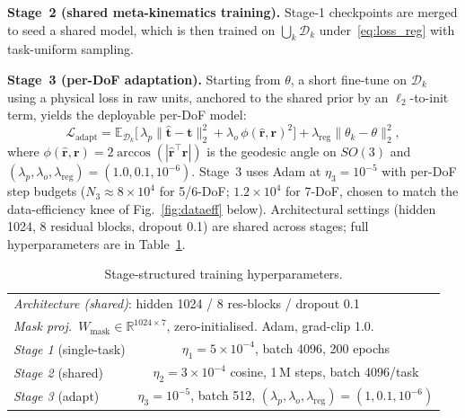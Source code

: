 \documentclass[conference]{IEEEtran}
\begin{document}
\textbf{Stage~2 (shared meta-kinematics training).} Stage-1 checkpoints are merged to seed a shared model, which is then trained on $\bigcup_k\mathcal{D}_k$ under~\eqref{eq:loss_reg} with task-uniform sampling.

\textbf{Stage~3 (per-DoF adaptation).} Starting from $\theta$, a short fine-tune on $\mathcal{D}_k$ using a physical loss in raw units, anchored to the shared prior by an $\ell_2$-to-init term, yields the deployable per-DoF model:
\begin{equation}
\!\!\mathcal{L}_{\mathrm{adapt}}\!=\!\mathbb{E}_{\mathcal{D}_k}\!\bigl[\,\lambda_p\lVert\hat{\mathbf{t}}-\mathbf{t}\rVert_2^2\!+\!\lambda_o\,\phi(\hat{\mathbf{r}},\mathbf{r})^2\bigr]\!+\!\lambda_{\mathrm{reg}}\lVert\theta_k\!-\!\theta\rVert_2^2,
\label{eq:loss_adapt}
\end{equation}
where $\phi(\hat{\mathbf{r}},\mathbf{r})\!=\!2\arccos(|\hat{\mathbf{r}}^\top\mathbf{r}|)$ is the geodesic angle on $SO(3)$ and $(\lambda_p,\lambda_o,\lambda_{\mathrm{reg}})\!=\!(1.0,0.1,10^{-6})$. Stage~3 uses Adam at $\eta_3\!=\!10^{-5}$ with per-DoF step budgets ($N_3\!\approx\!8\!\times\!10^4$ for 5/6-DoF; $1.2\!\times\!10^4$ for 7-DoF, chosen to match the data-efficiency knee of Fig.~\ref{fig:dataeff} below). Architectural settings (hidden 1024, 8 residual blocks, dropout 0.1) are shared across stages; full hyperparameters are in Table~\ref{tab:hparams}.

\begin{table}[!t]
\renewcommand{\arraystretch}{1.05}
\caption{Stage-structured training hyperparameters.}
\label{tab:hparams}
\centering
\footnotesize
\begin{tabular}{lc}
\toprule
\multicolumn{2}{l}{\textit{Architecture (shared)}: hidden 1024 / 8 res-blocks / dropout 0.1} \\
\multicolumn{2}{l}{\textit{Mask proj.\ }$W_{\mathrm{mask}}\!\in\!\mathbb{R}^{1024\times 7}$, zero-initialised. Adam, grad-clip 1.0.} \\
\midrule
\textit{Stage 1} (single-task) & $\eta_1\!=\!5\!\times\!10^{-4}$, batch 4096, 200 epochs \\
\textit{Stage 2} (shared) & $\eta_2\!=\!3\!\times\!10^{-4}$ cosine, 1\,M steps, batch 4096/task \\
\textit{Stage 3} (adapt) & $\eta_3\!=\!10^{-5}$, batch 512, $(\lambda_p,\lambda_o,\lambda_{\mathrm{reg}})\!=\!(1,0.1,10^{-6})$ \\
\bottomrule
\end{tabular}
\end{table}
\end{document}
